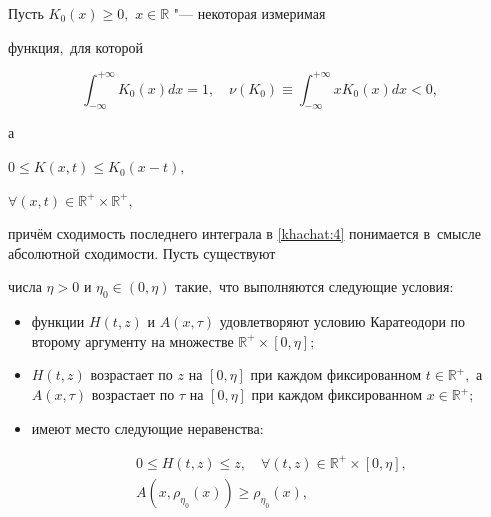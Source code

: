 \begin{theorem}[1]

Пусть $K_0(x)\geq0,$ $x\in\mathbb{R}$ "--- некоторая измеримая

функция$,$ для которой

\begin{equation}

\int _{-\infty}^{+\infty}K_0(x)dx=1,\quad \nu(K_0)\equiv\int _{-\infty}^{+\infty}xK_0(x)dx<0,\label{khachat:4}

\end{equation}

а


$0\leq K(x,t)\leq K_0(x-t),$%

$\forall(x, t)\in\mathbb{R}^+\times\mathbb{R}^+,$



причём сходимость последнего интеграла в \eqref{khachat:4} понимается в~смысле абсолютной сходимости$.$ Пусть  существуют

числа $\eta>0$ и $\eta_0\in(0,\eta)$ такие$,$ что выполняются следующие условия\/$:$



\begin{itemize}

\item[a\rm)] функции $H(t,z)$ и $A(x,\tau)$ удовлетворяют условию Каратеодори по второму аргументу на множестве $\mathbb{R}^+\times[0,\eta];$



\item[b\rm)] $H(t,z)$ возрастает по $z$ на $[0,\eta]$ при каждом фиксированном $t\in\mathbb{R}^+,$ а $A(x,\tau)$ возрастает по $\tau$ на $[0,\eta]$ при каждом фиксированном $x\in\mathbb{R}^+;$



\item[c\rm)] имеют место следующие неравенства\/$:$

\begin{gather}

0\leq H(t,z)\leq z,\quad \forall

(t,z)\in\mathbb{R}^+\times[0,\eta], \label{khachat:6}\\

A(x,\rho_{\eta_0}(x))\geq\rho_{\eta_0}(x),\quad


\end{gather}
\end{itemize}
\end{theorem}

